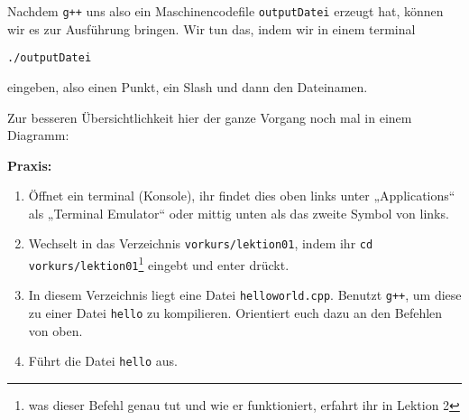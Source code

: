 Nachdem \texttt{g++} uns also ein Maschinencodefile \texttt{outputDatei}
erzeugt hat, können wir es zur Ausführung bringen. Wir tun das, indem wir in
einem \Gls{terminal}
\begin{center}
    \texttt{./outputDatei}
\end{center}
eingeben, also einen Punkt, ein Slash und dann den Dateinamen.

Zur besseren Übersichtlichkeit hier der ganze Vorgang noch mal in einem
Diagramm:

\begin{center}
\end{center}

\textbf{Praxis:}
\begin{enumerate}
    \item Öffnet ein \Gls{terminal} (Konsole), ihr findet dies oben links unter „Applications“ als „Terminal Emulator“ oder mittig unten als das zweite Symbol von links.
    \item Wechselt in das Verzeichnis \texttt{vorkurs/lektion01}, indem ihr
          \texttt{cd vorkurs/lektion01}\footnote{was dieser Befehl genau tut und wie er funktioniert, erfahrt ihr in Lektion 2} eingebt und enter drückt.
    \item In diesem Verzeichnis liegt eine Datei \texttt{helloworld.cpp}.
          Benutzt \texttt{g++}, um diese zu einer Datei \texttt{hello} zu
          kompilieren. Orientiert euch dazu an den Befehlen von oben.
    \item Führt die Datei \texttt{hello} aus.
\end{enumerate}

